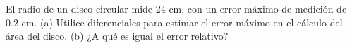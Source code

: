 \item El radio de un disco circular mide $24 \text{ cm}$, con un error máximo de medición de $0.2 \text{ cm}$. (a) Utilice diferenciales para estimar el error máximo en el cálculo del área del disco. (b) ¿A qué es igual el error relativo?

